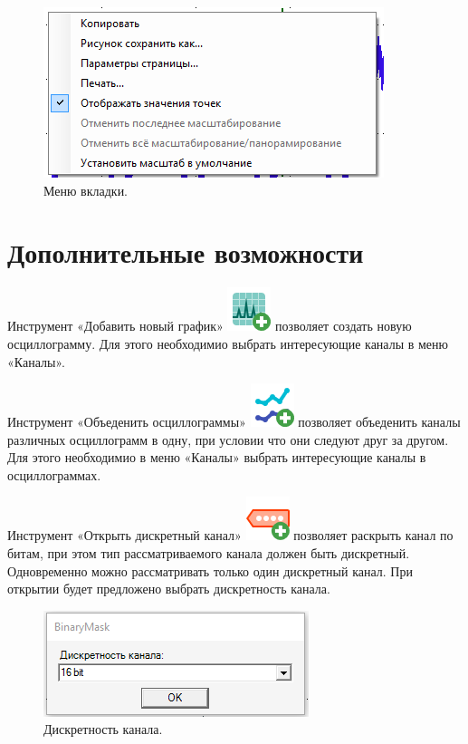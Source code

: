 \documentclass[a4paper,12pt]{article}
\begin{document}
\begin{figure}[h]
\centering
\includegraphics[width=40ex]{image/Screenshot_6.png}
\caption{Меню вкладки.}
\end{figure}

\section*{\hspace{.5cm} Дополнительные возможности}
\hspace{.5cm} Инструмент «Добавить новый график»  \includegraphics[width=4ex]{image/Chromatography.png}  позволяет создать новую осциллограмму. Для этого необходимио выбрать интересующие каналы в меню «Каналы». 

Инструмент «Объеденить осциллограммы»  \includegraphics[width=4ex]{image/Line_Chart.png}  позволяет объеденить каналы различных осциллограмм в одну, при условии что они следуют друг за другом. Для этого необходимио в меню «Каналы» выбрать интересующие каналы в осциллограммах. 

Инструмент «Открыть дискретный канал»  \includegraphics[width=4ex]{image/Dig_Add.png}  позволяет раскрыть канал по битам, при этом тип рассматриваемого канала должен быть дискретный. Одновременно можно рассматривать только один дискретный канал. При открытии будет предложено выбрать дискретность канала.

\begin{figure}[h]
\centering
\includegraphics[width=40ex]{image/BinaryMask.png}
\caption{Дискретность канала.}
\end{figure}
\end{document}
